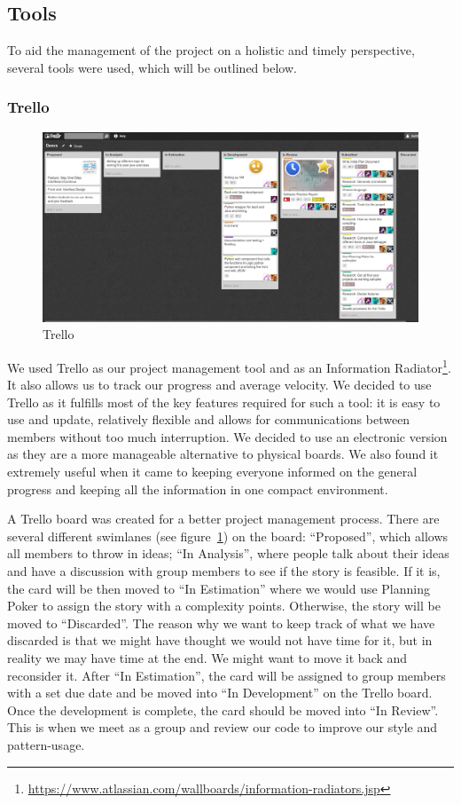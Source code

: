 \documentclass[11pt, a4paper]{article}
\begin{document}
\subsection{Tools}

To aid the management of the project on a holistic and timely perspective, several tools were used, which will be outlined below.

\subsubsection{Trello}
\begin{figure}[h!]
\centering
\includegraphics[width=\textwidth]{Trello.png}
\caption{Trello}
\label{fig:Trello}
\end{figure}

We used Trello as our project management tool and as an Information Radiator\footnote{\url{https://www.atlassian.com/wallboards/information-radiators.jsp}}.
It also allows us to track our progress and average velocity. 
We decided to use Trello as it fulfills most of the key features required for such a tool: it is easy to use and update, relatively flexible and allows for communications between members without too much interruption. 
We decided to use an electronic version as they are a more manageable alternative to physical boards. 
We also found it extremely useful when it came to keeping everyone informed on the general progress and keeping all the information in one compact environment.

A Trello board was created for a better project management process. 
There are several different swimlanes (see figure~\ref{fig:Trello}) on the board: ``Proposed'', which allows all members to throw in ideas; ``In Analysis'', where people talk about their ideas and have a discussion with group members to see if the story is feasible. 
If it is, the card will be then moved to ``In Estimation'' where we would use Planning Poker to assign the story with a complexity points.
Otherwise, the story will be moved to ``Discarded''.
The reason why we want to keep track of what we have discarded is that we might have thought we would not have time for it, but in reality we may have time at the end.
We might want to move it back and reconsider it. 
After ``In Estimation'', the card will be assigned to group members with a set due date and be moved into ``In Development'' on the Trello board. 
Once the development is complete, the card should be moved into ``In Review''. 
This is when we meet as a group and review our code to improve our style and pattern-usage.
\end{document}
